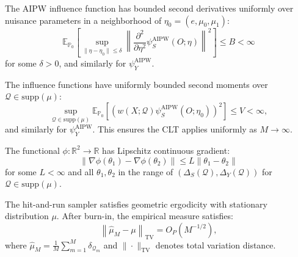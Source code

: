 \begin{assumption}
\label{assm:second-derivatives}
The AIPW influence function has bounded second derivatives uniformly over nuisance parameters in a neighborhood of $\eta_0 = (e, \mu_0, \mu_1)$:
\begin{equation}
\mathbb{E}_{\mathbb{P}_0}\left[\sup_{\|\eta - \eta_0\| \leq \delta} \left\|\frac{\partial^2}{\partial\eta^2}\psi_S^{\text{AIPW}}(O; \eta)\right\|^2\right] \leq B < \infty
\end{equation}
for some $\delta > 0$, and similarly for $\psi_Y^{\text{AIPW}}$.
\end{assumption}

\begin{assumption}
\label{assm:bounded-if-variance}
The influence functions have uniformly bounded second moments over $\mathcal{Q} \in \text{supp}(\mu)$:
\begin{equation}
\sup_{\mathcal{Q} \in \text{supp}(\mu)} \mathbb{E}_{\mathbb{P}_0}[(w(X; \mathcal{Q}) \psi_S^{\text{AIPW}}(O; \eta_0))^2] \leq V < \infty,
\end{equation}
and similarly for $\psi_Y^{\text{AIPW}}$. This ensures the CLT applies uniformly as $M \to \infty$.
\end{assumption}

\begin{assumption}
\label{assm:lipschitz}
The functional $\phi: \mathbb{R}^2 \to \mathbb{R}$ has Lipschitz continuous gradient:
\begin{equation}
\|\nabla\phi(\theta_1) - \nabla\phi(\theta_2)\| \leq L\|\theta_1 - \theta_2\|
\end{equation}
for some $L < \infty$ and all $\theta_1, \theta_2$ in the range of $(\Delta_S(\mathcal{Q}), \Delta_Y(\mathcal{Q}))$ for $\mathcal{Q} \in \text{supp}(\mu)$.
\end{assumption}

\begin{assumption}
\label{assm:mcmc}
The hit-and-run sampler satisfies geometric ergodicity with stationary distribution $\mu$. After burn-in, the empirical measure satisfies:
\begin{equation}
\left\|\hat{\mu}_M - \mu\right\|_{\text{TV}} = O_P(M^{-1/2}),
\end{equation}
where $\hat{\mu}_M = \frac{1}{M}\sum_{m=1}^M \delta_{\mathcal{Q}_m}$ and $\|\cdot\|_{\text{TV}}$ denotes total variation distance.
\end{assumption}


